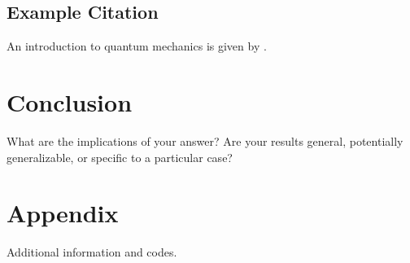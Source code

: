 \documentclass[%
 reprint,
 superscriptaddress,
 amsmath,amssymb,
pra,
]{revtex4-1}
\begin{document}
\subsection*{Example Citation}

An introduction to quantum mechanics is given by \cite{griffiths2016introduction}.

\section{Conclusion}
\label{sec:conclusion}
What are the implications of your answer? Are your results general, potentially generalizable, or specific to a particular case?

\section*{Appendix}
Additional information and codes.




\end{document}
